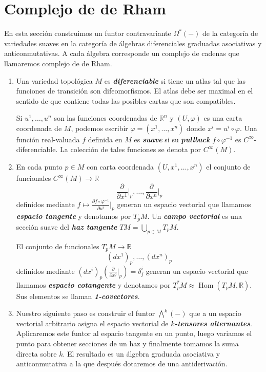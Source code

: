 \documentclass[spanish]{article}
\theoremstyle{definition}
\newcommand{\R}{\mathbb{R}}
\newcommand{\Cinf}{C^\infty}
\DeclareMathOperator{\Hom}{Hom}
\begin{document}
	\section{Complejo de de Rham}\label{sec:2}
	En esta sección construimos un funtor contravariante $\Omega^*(-)$ de la categoría de variedades suaves en la categoría de álgebras diferenciales graduadas asociativas y anticonmutativas. A cada álgebra corresponde un complejo de cadenas que llamaremos complejo de de Rham.
	\begin{enumerate}
		\item Una variedad topológica $M$ es \textbf{\textit{diferenciable}} si tiene un atlas tal que las funciones de transición son difeomorfismos. 
		El atlas debe ser maximal en el sentido de que contiene todas las posibles cartas que son compatibles.
		
		Si $u^1,\ldots,u^n$ son las funciones coordenadas de $\R^n$ y $(U,\varphi)$ es una carta coordenada de $M$, podemos escribir $\varphi=(x^1,\ldots,x^n)$ donde  $x^i=u^i\circ\varphi$. Una función real-valuada $f$ definida en $M$ es \textbf{\textit{suave}} si su \textbf{\textit{pullback}} $f\circ\varphi^{-1}$ es $\Cinf$-diferenciable. La colección de tales funciones se denota por $\Cinf(M)$.
		
		\item En cada punto $p\in M$ con carta coordenada $(U,x^1,\ldots,x^n)$ el conjunto de funcionales $\Cinf(M)\to \R$
		\[\frac{\partial}{\partial x^1}\Big|_p,\ldots,\frac{\partial}{\partial x^n}\Big|_p\]
		definidos mediante $f\mapsto \frac{\partial f\circ\varphi^{-1}}{\partial u^i}\Big|_p$ generan un espacio vectorial que llamamos \textbf{\textit{espacio tangente}} y denotamos por $T_pM$. Un \textbf{\textit{campo vectorial}} es una sección suave del \textbf{\textit{haz tangente}} $TM=\bigcup_{p\in M}T_pM$.
		
		El conjunto de funcionales $T_pM\to \R$
		\[(dx^1)_p,\ldots,(dx^n)_p\]
		definidos mediante $(dx^i)_p\left(\frac{\partial}{\partial x^j}\Big|_p\right)=\delta_j^i$ generan un espacio vectorial que llamamos \textbf{\textit{espacio cotangente}} y denotamos por $T_p^*M\approx\Hom(T_pM,\R)$. Sus elementos se llaman \textbf{\textit{1-covectores}}.
		
		\item Nuestro siguiente paso es construir el funtor $\bigwedge^k(-)$ que a un espacio vectorial arbitrario asigna el espacio vectorial de \textbf{\textit{$k$-tensores alternantes}}. Aplicaremos este funtor al espacio tangente en un punto, luego variamos el punto para obtener secciones de un haz y finalmente tomamos la suma directa sobre $k$. El resultado es un álgebra graduada asociativa y anticonmutativa a la que después dotaremos de una antiderivación.
		

\end{enumerate}
\end{document}
